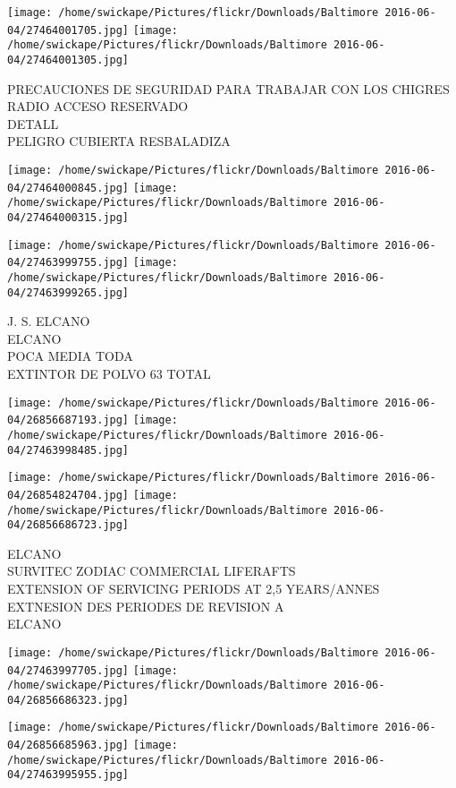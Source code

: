 \documentclass[10pt,letterpaper]{article}
\begin{document}
\texttt{[image: /home/swickape/Pictures/flickr/Downloads/Baltimore 2016-06-04/27464001705.jpg]}
\texttt{[image: /home/swickape/Pictures/flickr/Downloads/Baltimore 2016-06-04/27464001305.jpg]}

PRECAUCIONES DE SEGURIDAD PARA TRABAJAR CON LOS CHIGRES\\
RADIO ACCESO RESERVADO\\
DETALL\\
PELIGRO CUBIERTA RESBALADIZA
\pagebreak

\texttt{[image: /home/swickape/Pictures/flickr/Downloads/Baltimore 2016-06-04/27464000845.jpg]}
\texttt{[image: /home/swickape/Pictures/flickr/Downloads/Baltimore 2016-06-04/27464000315.jpg]}

\texttt{[image: /home/swickape/Pictures/flickr/Downloads/Baltimore 2016-06-04/27463999755.jpg]}
\texttt{[image: /home/swickape/Pictures/flickr/Downloads/Baltimore 2016-06-04/27463999265.jpg]}

J. S. ELCANO\\
ELCANO\\
POCA MEDIA TODA\\
EXTINTOR DE POLVO 63 TOTAL
\pagebreak

\texttt{[image: /home/swickape/Pictures/flickr/Downloads/Baltimore 2016-06-04/26856687193.jpg]}
\texttt{[image: /home/swickape/Pictures/flickr/Downloads/Baltimore 2016-06-04/27463998485.jpg]}

\texttt{[image: /home/swickape/Pictures/flickr/Downloads/Baltimore 2016-06-04/26854824704.jpg]}
\texttt{[image: /home/swickape/Pictures/flickr/Downloads/Baltimore 2016-06-04/26856686723.jpg]}

ELCANO\\
SURVITEC ZODIAC COMMERCIAL LIFERAFTS\\
EXTENSION OF SERVICING PERIODS AT 2,5 YEARS/ANNES EXTNESION DES PERIODES DE REVISION A\\
ELCANO
\pagebreak

\texttt{[image: /home/swickape/Pictures/flickr/Downloads/Baltimore 2016-06-04/27463997705.jpg]}
\texttt{[image: /home/swickape/Pictures/flickr/Downloads/Baltimore 2016-06-04/26856686323.jpg]}

\texttt{[image: /home/swickape/Pictures/flickr/Downloads/Baltimore 2016-06-04/26856685963.jpg]}
\texttt{[image: /home/swickape/Pictures/flickr/Downloads/Baltimore 2016-06-04/27463995955.jpg]}
\end{document}
